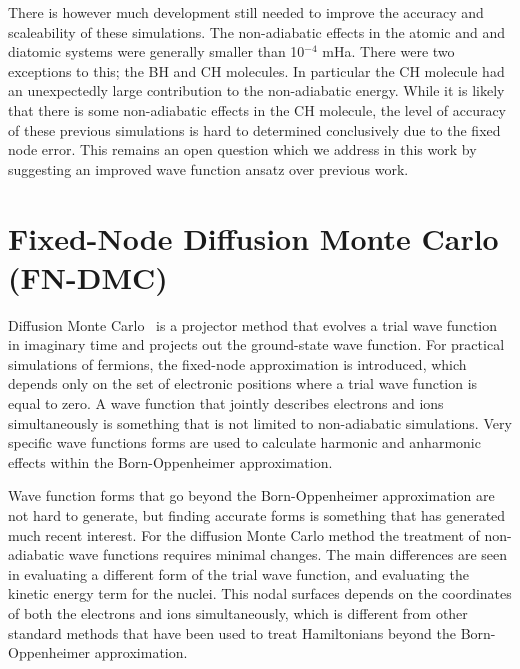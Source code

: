 \documentclass[aip,jcp,numerical,reprint]{revtex4-1}
\begin{document}
There is however much development still needed to improve the accuracy and scaleability of these simulations.  The non-adiabatic effects in the atomic and and diatomic systems were generally smaller than 10$^{-4}$ mHa. There were two exceptions to this; the BH and CH molecules. In particular the CH molecule had an unexpectedly large contribution to the non-adiabatic energy.   While it is likely that there is some non-adiabatic effects in the CH molecule, the level of accuracy of these previous simulations is hard to determined conclusively due to the fixed node error.   This remains an open question which we address in this work by suggesting an improved wave function ansatz over previous work.


\section{Fixed-Node Diffusion Monte Carlo (FN-DMC)}
Diffusion Monte Carlo~\cite{Anderson_DMC,lester1,Stuart_Review,Needs_Review,Needs_Old_Review,QMC_Review} is a projector method that evolves a trial wave function in imaginary time and projects out the ground-state wave function. For practical simulations of fermions, the fixed-node approximation is introduced, which depends only on the set of electronic positions where a trial wave function is equal to zero.  A wave function that jointly describes electrons and ions simultaneously is something that is not limited to non-adiabatic simulations.    Very specific wave functions forms are used to calculate harmonic and anharmonic effects within the Born-Oppenheimer approximation.  

  Wave function forms that go beyond the Born-Oppenheimer approximation are not hard to generate, but finding accurate forms is something that has generated  much recent interest.  For the diffusion Monte Carlo method the treatment of non-adiabatic wave functions requires minimal changes.  The main differences are seen in evaluating a different form of the trial wave function, and  evaluating the kinetic energy term for the nuclei.   This nodal surfaces  depends on the coordinates of both the electrons and ions simultaneously, which is different from other standard methods that have been used to treat Hamiltonians beyond the Born-Oppenheimer approximation.%
\end{document}
